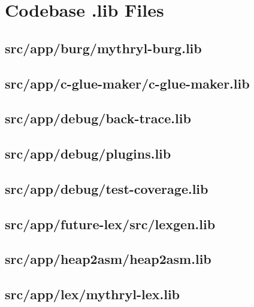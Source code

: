 \section{Codebase .lib Files}



\subsection{src/app/burg/mythryl-burg.lib}


\subsection{src/app/c-glue-maker/c-glue-maker.lib}


\subsection{src/app/debug/back-trace.lib}


\subsection{src/app/debug/plugins.lib}


\subsection{src/app/debug/test-coverage.lib}


\subsection{src/app/future-lex/src/lexgen.lib}


\subsection{src/app/heap2asm/heap2asm.lib}


\subsection{src/app/lex/mythryl-lex.lib}


